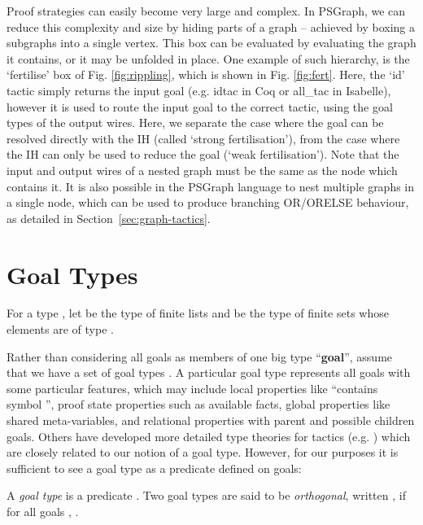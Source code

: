 \documentclass{llncs}
\begin{document}
Proof strategies can easily become very large and complex. In PSGraph, we can
reduce this complexity and size by hiding parts of a graph -- achieved by
boxing a subgraphs into a single vertex. This box can be evaluated by
evaluating the graph it contains, or it may be unfolded in place. One
example of such hierarchy, is the `fertilise' box of Fig. \ref{fig:rippling},
which is shown in Fig. \ref{fig:fert}. Here, the `id' tactic simply returns
the input goal (e.g. \textsf{idtac} in Coq or \textsf{all\_tac} in Isabelle),
however it is used to route the input goal to the correct tactic, using the
goal types of the output wires. Here, we separate the case where the
goal can be resolved directly with the IH (called `strong fertilisation'),
from the case where the IH can only be used to reduce the goal (`weak fertilisation').
Note that the input and output wires of a nested graph must be the same as the
node which contains it. It is also possible in the PSGraph language to nest multiple graphs
in a single node, which can be used to produce branching OR/ORELSE behaviour, as detailed in
Section~\ref{sec:graph-tactics}.

\beforesection
\section{Goal Types}\label{sec:tactic}
\aftersection

For a type , let  be the type of finite lists and  be the type of finite sets whose elements are of type .

Rather than considering all goals as members of one big type ``\textbf{goal}'', assume that we have a 
set of goal types . A particular goal type  represents all goals with some particular features, which may include local properties like ``contains symbol '', proof state properties 
such as available facts, global properties like shared meta-variables, 
and relational properties with parent and possible children goals. Others have developed more detailed type theories for tactics (e.g. \cite{Stampoulis10}) which are closely related to our notion of a goal type. However, for our purposes it is sufficient to see a goal type as a predicate defined on goals:

\begin{definition}\label{def:goal-type} \rm
A \emph{goal type}  is a predicate . Two goal types are said to be \emph{orthogonal}, written , if for all goals , .
\end{definition} 
\end{document}

